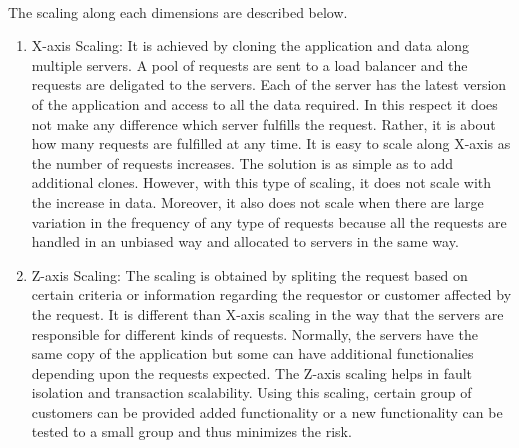\begin{enumerate}

\\
The scaling along each dimensions are described below. \cite{Fisher:2015aa}\cite{MacVittie:2014aa}\cite{Richardson:2014aa}
\begin{enumerate}
\item X-axis Scaling: It is achieved by cloning the application and data along multiple servers. A pool of requests are sent to a load balancer and the requests are deligated to the servers. Each of the server has the latest version of the application and access to all the data required. In this respect it does not make any difference which server fulfills the request. Rather, it is about how many requests are fulfilled at any time. It is easy to scale along X-axis as the number of requests increases. The solution is as simple as to add additional clones. However, with this type of scaling, it does not scale with the increase in data. Moreover, it also does not scale when there are large variation in the frequency of any type of requests because all the requests are handled in an unbiased way and allocated to servers in the same way.
\\
\item Z-axis Scaling: The scaling is obtained by spliting the request based on certain criteria or information regarding the requestor or customer affected by the request. It is different than X-axis scaling in the way that the servers are responsible for different kinds of requests. Normally, the servers have the same copy of the application but some can have additional functionalies depending upon the requests expected. The Z-axis scaling helps in fault isolation and transaction scalability. Using this scaling, certain group of customers can be provided added functionality or a new functionality can be tested to a small group and thus minimizes the risk.

\end{enumerate}
\end{enumerate}
